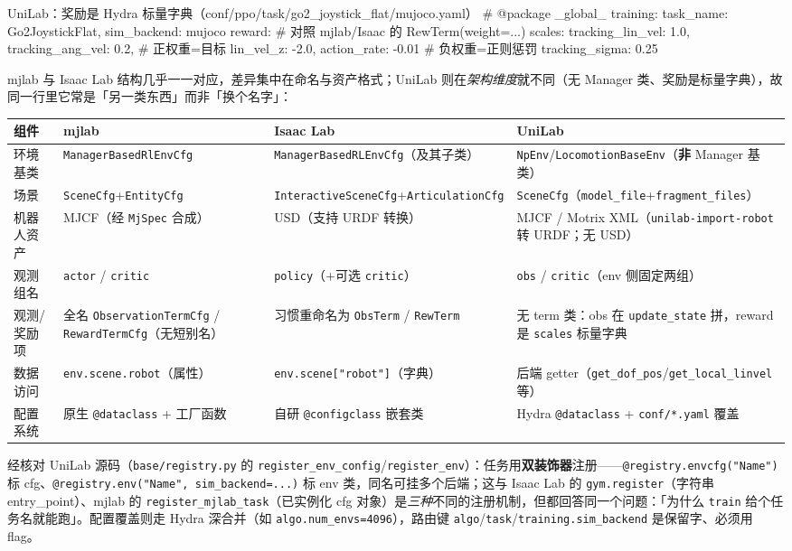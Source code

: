 \begin{codebox}[text]{UniLab：奖励是 Hydra 标量字典（conf/ppo/task/go2\_joystick\_flat/mujoco.yaml）}
# @package _global_
training: {task_name: Go2JoystickFlat, sim_backend: mujoco}
reward:                                  # 对照 mjlab/Isaac 的 RewTerm(weight=...)
  scales: {tracking_lin_vel: 1.0, tracking_ang_vel: 0.2,   # 正权重=目标
           lin_vel_z: -2.0, action_rate: -0.01}            # 负权重=正则惩罚
  tracking_sigma: 0.25
\end{codebox}

mjlab 与 Isaac Lab 结构几乎一一对应，差异集中在命名与资产格式；UniLab 则在\emph{架构维度}就不同（无 Manager 类、奖励是标量字典），故同一行里它常是「另一类东西」而非「换个名字」：

\begin{center}
\small
\begin{tabular}{@{}p{2.0cm}p{3.0cm}p{3.4cm}p{4.0cm}@{}}
\toprule
组件 & mjlab & Isaac Lab & UniLab \\
\midrule
环境基类 & \verb|ManagerBasedRlEnvCfg| & \verb|ManagerBasedRLEnvCfg|（及其子类） & \verb|NpEnv|/\verb|LocomotionBaseEnv|（\textbf{非} Manager 基类） \\
场景 & \verb|SceneCfg|+\verb|EntityCfg| & \verb|InteractiveSceneCfg|+\verb|ArticulationCfg| & \verb|SceneCfg|（\verb|model_file|+\verb|fragment_files|） \\
机器人资产 & MJCF（经 \verb|MjSpec| 合成） & USD（支持 URDF 转换） & MJCF / Motrix XML（\verb|unilab-import-robot| 转 URDF；无 USD） \\
观测组名 & \verb|actor| / \verb|critic| & \verb|policy|（+可选 \verb|critic|） & \verb|obs| / \verb|critic|（env 侧固定两组） \\
观测/奖励项 & 全名 \verb|ObservationTermCfg| / \verb|RewardTermCfg|（无短别名） & 习惯重命名为 \verb|ObsTerm| / \verb|RewTerm| & 无 term 类：obs 在 \verb|update_state| 拼，reward 是 \verb|scales| 标量字典 \\
数据访问 & \verb|env.scene.robot|（属性） & \verb|env.scene["robot"]|（字典） & 后端 getter（\verb|get_dof_pos|/\verb|get_local_linvel| 等） \\
配置系统 & 原生 \verb|@dataclass| + 工厂函数 & 自研 \verb|@configclass| 嵌套类 & Hydra \verb|@dataclass| + \verb|conf/*.yaml| 覆盖 \\
\bottomrule
\end{tabular}
\end{center}

经核对 UniLab 源码（\verb|base/registry.py| 的 \verb|register_env_config|/\verb|register_env|）：任务用\textbf{双装饰器}注册——\verb|@registry.envcfg("Name")| 标 cfg、\verb|@registry.env("Name", sim_backend=...)| 标 env 类，同名可挂多个后端；这与 Isaac Lab 的 \verb|gym.register|（字符串 entry\_point）、mjlab 的 \verb|register_mjlab_task|（已实例化 cfg 对象）是\emph{三种}不同的注册机制，但都回答同一个问题：「为什么 \verb|train| 给个任务名就能跑」。配置覆盖则走 Hydra 深合并（如 \verb|algo.num_envs=4096|），路由键 \verb|algo|/\verb|task|/\verb|training.sim_backend| 是保留字、必须用 flag。

